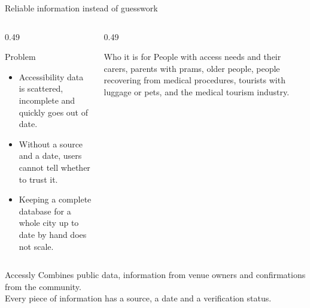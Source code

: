 \begin{frame}{Reliable information instead of guesswork}
  \begin{columns}[T,onlytextwidth]
    \begin{column}{0.49\textwidth}
      \begin{block}{Problem}
        \begin{itemize}
          \item Accessibility data is scattered, incomplete and quickly goes out of date.
          \item Without a source and a date, users cannot tell whether to trust it.
          \item Keeping a complete database for a whole city up to date by hand does not scale.
        \end{itemize}
      \end{block}
    \end{column}
    \begin{column}{0.49\textwidth}
      \begin{block}{Who it is for}
        People with access needs and their carers, parents with prams, older people, people recovering from
        medical procedures, tourists with luggage or pets, and the medical tourism industry.
      \end{block}
    \end{column}
  \end{columns}
  \vspace{1mm}
  \begin{exampleblock}{Accessly}
    Combines public data, information from venue owners and confirmations from the community.\\
    Every piece of information has a source, a date and a verification status.
  \end{exampleblock}

\end{frame}
